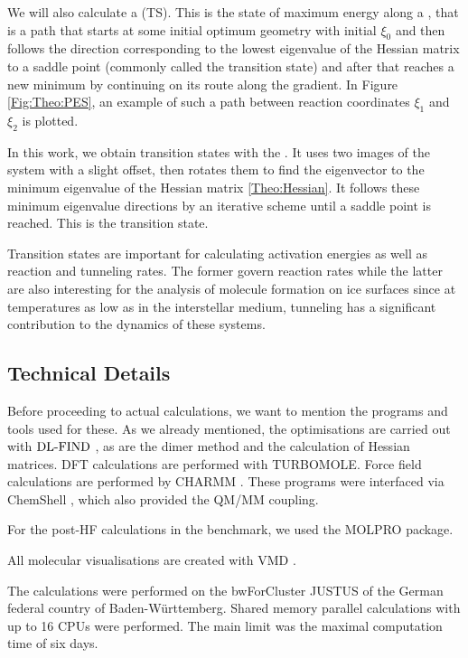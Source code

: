 \documentclass[8.5pt,twoside,twocolumn]{article}
\newcommand\dlfind{\enmat{\te{DL-FIND}}}
\theoremstyle{standard}
\begin{document}
We will also calculate a  (TS). This
is the state of maximum energy along a , that is a path that
starts at some initial optimum geometry with initial 
$\xi_0$ and then follows the direction corresponding to the lowest eigenvalue of the
Hessian matrix to a saddle point (commonly called the transition state) and
after that reaches a new minimum by continuing on its route along the gradient. In Figure
\ref{Fig:Theo:PES}, an example of such a path between reaction coordinates
$\xi_1$ and $\xi_{2}$ is plotted.

In this work, we obtain transition states with the 
\cite{HenkelmanJonsson1999}. It uses two images of the system with a slight offset, then
rotates them to find the eigenvector to the minimum eigenvalue of the Hessian
matrix \eqref{Theo:Hessian}. It follows these minimum eigenvalue directions by an
iterative scheme until a saddle point is reached. This is the transition state.

Transition states are important for calculating activation energies as well as
reaction and tunneling rates. The former govern reaction rates while the latter
are also interesting for the analysis of molecule formation on ice surfaces since at
temperatures as low as in the interstellar medium, tunneling has a significant
contribution to the dynamics of these systems.

\subsection{Technical Details}

Before proceeding to actual calculations, we want to mention the programs and tools 
used for these. As we already mentioned, the optimisations are carried out with
$\dlfind$ \cite{Kaestner2009}, as are the dimer method and the calculation of 
Hessian matrices. DFT calculations are performed with TURBOMOLE\cite{TURBOMOLE}.
Force field calculations are performed by CHARMM \cite{CHARMM2009}. These programs were interfaced
via ChemShell \cite{chemshell,MetzKaestnerSokolEtAl2013}, which also provided
the QM/MM coupling.

For the post-HF calculations in the benchmark, we used the MOLPRO \cite{MOLPRO_brief}
package.

All molecular visualisations are created with VMD \cite{HUMP96}.

The calculations were performed on the bwForCluster JUSTUS of the German federal country
of Baden-Württemberg. Shared memory parallel calculations with up to 16 CPUs
were performed. The main limit was the maximal computation time of six days.
\end{document}
